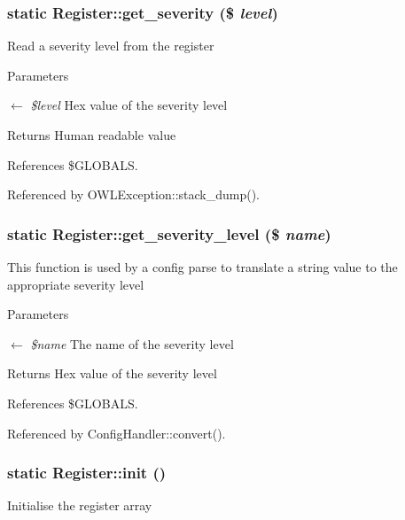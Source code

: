\subsubsection[{get\_\-severity}]{\setlength{\rightskip}{0pt plus 5cm}static Register::get\_\-severity (\$ {\em level})}\label{classRegister_ae71e10bddb03483b54ad22b9edb95b7c}
Read a severity level from the register


\begin{DoxyParams}{Parameters}
\item[\mbox{$\leftarrow$} {\em \$level}]Hex value of the severity level \end{DoxyParams}
\begin{DoxyReturn}{Returns}
Human readable value 
\end{DoxyReturn}


References \$GLOBALS.



Referenced by OWLException::stack\_\-dump().

\subsubsection[{get\_\-severity\_\-level}]{\setlength{\rightskip}{0pt plus 5cm}static Register::get\_\-severity\_\-level (\$ {\em name})}\label{classRegister_a70490e59a4a3b910d259b8a4287c3e91}
This function is used by a config parse to translate a string value to the appropriate severity level


\begin{DoxyParams}{Parameters}
\item[\mbox{$\leftarrow$} {\em \$name}]The name of the severity level \end{DoxyParams}
\begin{DoxyReturn}{Returns}
Hex value of the severity level 
\end{DoxyReturn}


References \$GLOBALS.



Referenced by ConfigHandler::convert().

\subsubsection[{init}]{\setlength{\rightskip}{0pt plus 5cm}static Register::init ()}\label{classRegister_a5c34c30e9e6ce4dea2dbb02f55e9278a}
Initialise the register array 

